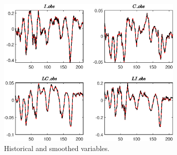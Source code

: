  
\begin{figure}[H]
\centering 
\includegraphics[width=0.80\textwidth]{BRS_comovement/graphs/BRS_comovement_HistoricalAndSmoothedVariables1}
\caption{Historical and smoothed variables.}\label{Fig:HistoricalAndSmoothedVariables:1}
\end{figure}


